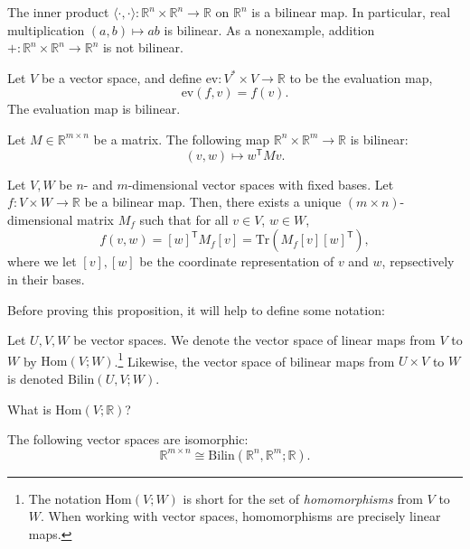 \begin{example}
The inner product $\langle \cdot , \cdot \rangle : \mathbb{R}^n \times
\mathbb{R}^n \to \mathbb{R}$ on $\mathbb{R}^n$ is a bilinear map. In
particular, real multiplication $(a, b) \mapsto ab$ is bilinear. As a
nonexample, addition $+ : \mathbb{R}^n \times \mathbb{R}^n \to
\mathbb{R}^n$ is not bilinear. 
\end{example}

\begin{example}
Let $V$ be a vector space, and define $\mathrm{ev}: V^* \times V \to
\mathbb{R}$ to be the evaluation map, 
\[\mathrm{ev}(f,v) = f(v).\]
The evaluation map is bilinear. 
\end{example}

\begin{example}
  Let $M \in \mathbb{R}^{m \times n}$ be a matrix. The following map
  $\mathbb{R}^n \times \mathbb{R}^m \to \mathbb{R}$ is bilinear: 
  \[(v, w) \mapsto w^\mathsf{T} M v.\]
\end{example}
\begin{proposition} \label{bilin-mat-rep} Let $V, W$ be $n$- and
  $m$-dimensional vector spaces with fixed bases. Let $f : V \times W
  \to \mathbb{R}$ be a bilinear map. Then, there exists a unique
  $(m\times n)$-dimensional matrix $M_f$ such that for all $v \in V$,
  $w \in W$, 
  \[f(v,w) = [w]^\mathsf{T} M_f [v] = \mathrm{Tr}(M_f
     [v][w]^\mathsf{T}),\] 
where we let $[v], [w]$ be the coordinate representation of $v$ and
$w$, repsectively in their bases. 
\end{proposition}

Before proving this proposition, it will help to define some notation:
\begin{definition}
  Let $U, V, W$ be vector spaces. We denote the vector space of linear
  maps from $V$ to $W$ by $\mathrm{Hom}(V;W)$.\footnote{The notation
    $\mathrm{Hom}(V;W)$ is short for the set of \emph{homomorphisms}
    from $V$ to $W$. When working with vector spaces, homomorphisms
    are precisely linear maps.} Likewise, the vector space of bilinear
  maps from $U \times V$ to $W$ is denoted $\mathrm{Bilin}(U,V; W)$. 
\end{definition}

\begin{exercise} What is $\mathrm{Hom}(V;\mathbb{R})$?
\end{exercise}

\begin{corollary} \label{mat-bilin} The following vector spaces are
  isomorphic: 
  \[\mathbb{R}^{m \times n} \cong \mathrm{Bilin}(\mathbb{R}^n,
  \mathbb{R}^m; \mathbb{R}).\] 
\end{corollary}

